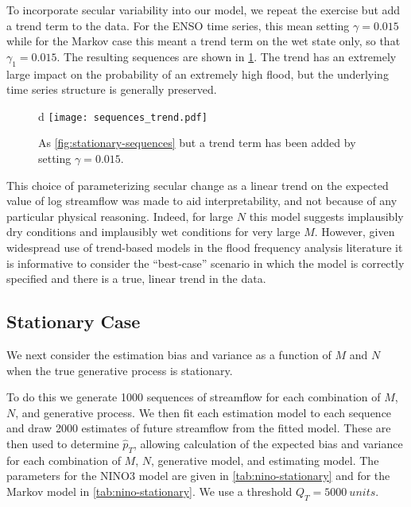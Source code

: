 \documentclass[12pt]{article}
\begin{document}
To incorporate secular variability into our model, we repeat the exercise but add a trend term to the data.
For the ENSO time series, this mean setting \(\gamma=0.015\) while for the Markov case this meant a trend term on the wet state only, so that \(\gamma_1=0.015\).
The resulting sequences are shown in \cref{fig:trend-sequences}.
The trend has an extremely large impact on the probability of an extremely high flood, but the underlying time series structure is generally preserved.
\begin{figure}[b]d
  \texttt{[image: sequences\_trend.pdf]}
  \caption{
    As \cref{fig:stationary-sequences} but a trend term has been added by setting \(\gamma=0.015\).\label{fig:trend-sequences}
  }
\end{figure}

This choice of parameterizing secular change as a linear trend on the expected value of log streamflow was made to aid interpretability, and not because of any particular physical reasoning.
Indeed, for large \(N\) this model suggests implausibly dry conditions and implausibly wet conditions for very large \(M\).
However, given widespread use of trend-based models in the flood frequency analysis literature it is informative to consider the ``best-case'' scenario in which the model is correctly specified and there is a true, linear trend in the data.

\subsection{Stationary Case}\label{sec:results-stationary}

We next consider the estimation bias and variance as a function of \(M\) and \(N\) when the true generative process is stationary.

To do this we generate 1000 sequences of streamflow for each combination of \(M\), \(N\), and generative process.
We then fit each estimation model to each sequence and draw 2000 estimates of future streamflow from the fitted model.
These are then used to determine \(\hat{p}_T\), allowing calculation of the expected bias and variance for each combination of \(M\), \(N\), generative model, and estimating model.
The parameters for the NINO3 model are given in \cref{tab:nino-stationary} and for the Markov model in \cref{tab:nino-stationary}.
We use a threshold $Q_T = \SI{5000}{units}$.
\end{document}
